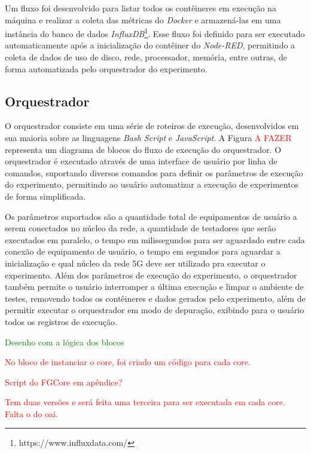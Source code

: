 Um fluxo foi desenvolvido para listar todos os contêineres em execução na máquina e realizar a coleta das métricas do \textit{Docker} e armazená-las em uma instância do banco de dados \textit{InfluxDB}\footnote{https://www.influxdata.com/}. Esse fluxo foi definido para ser executado automaticamente após a inicialização do contêiner do \textit{Node-RED}, permitindo a coleta de dados de uso de disco, rede, processador, memória, entre outras, de forma automatizada pelo orquestrador do experimento.

\subsection{Orquestrador}
\label{sub:arch-orchestrator}

O orquestrador consiste em uma série de roteiros de execução, desenvolvidos em sua maioria sobre as linguagens \textit{Bash Script} e \textit{JavaScript}.
A Figura \textcolor{red}{A FAZER} representa um diagrama de blocos do fluxo de execução do orquestrador.
O orquestrador é executado através de uma interface de usuário por linha de comandos, suportando diversos comandos para definir os parâmetros de execução do experimento, permitindo ao usuário automatizar a execução de experimentos de forma simplificada.

Os parâmetros suportados são a quantidade total de equipamentos de usuário a serem conectados no núcleo da rede, a quantidade de testadores que serão executados em paralelo, o tempo em milissegundos para ser aguardado entre cada conexão de equipamento de usuário, o tempo em segundos para aguardar a inicialização e qual núcleo da rede 5G deve ser utilizado pra executar o experimento.
Além dos parâmetros de execução do experimento, o orquestrador também permite o usuário interromper a última execução e limpar o ambiente de testes, removendo todos os contêineres e dados gerados pelo experimento, além de permitir executar o orquestrador em modo de depuração, exibindo para o usuário todos os registros de execução.

\textcolor{green}{Desenho com a lógica dos blocos}

\textcolor{red}{No bloco de instanciar o core, foi criado um código para cada core.}

\textcolor{red}{Script do FGCore em apêndice?}

\textcolor{red}{Tem duas versões e será feita uma terceira para ser executada em cada core. Falta o do oai.}